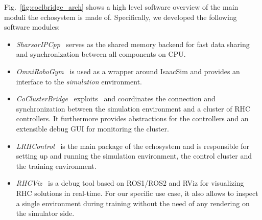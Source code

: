 Fig.~\ref{fig:coclbridge_arch} shows a high level software overview of the main moduli the echosystem is made of. Specifically, we developed the following software modules:
\begin{itemize}
	\item \textit{SharsorIPCpp}~\cite{mystuff::sharsoripcpp} serves as the shared memory backend for fast data sharing and synchronization between all components on CPU.
	\item \textit{OmniRoboGym}~\cite{mystuff::omnirobogym} is used as a wrapper around IsaacSim and provides an interface to the \textit{simulation} environment.
	\item \textit{CoClusterBridge}~\cite{mystuff::coclusterbridge} exploits~\cite{mystuff::sharsoripcpp} and coordinates the connection and synchronization between the simulation environment and a cluster of RHC controllers. It furthermore provides abstractions for the controllers and an extensible debug GUI for monitoring the cluster.
	\item \textit{LRHControl}~\cite{mystuff::lrhccontrol} is the main package of the echosystem and is responsible for setting up and running the simulation environment, the control cluster and the training environment.
	\item \textit{RHCViz}~\cite{mystuff::rhcviz} is a debug tool based on ROS1/ROS2 and RViz for visualizing RHC solutions in real-time. For our specific use case, it also allows to inspect a single environment during training without the need of any rendering on the simulator side.
\end{itemize}




